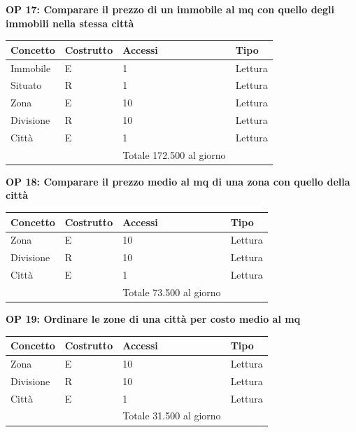 \documentclass[a4paper,12pt]{report}
\begin{document}
            \textbf{OP 17: Comparare il prezzo di un immobile al mq con quello degli immobili nella stessa città}
        	\begin{table}[H]
            \centering
             \begin{tabular}{||l l l l||}
             \hline
             Concetto & Costrutto & Accessi & Tipo \\ [0.5ex] 
             \hline\hline
             Immobile & E & 1 & Lettura \\ 
             Situato & R & 1 & Lettura \\ 
             Zona & E & 10 & Lettura \\ 
             Divisione & R & 10 & Lettura \\ 
             Città & E & 1 & Lettura \\ 
             \hline
                &   & Totale  172.500 al giorno &  \\ [1ex] 
             \hline
             \end{tabular}
            \end{table}

            \textbf{OP 18: Comparare il prezzo medio al mq di una zona con quello della città}
        	\begin{table}[H]
            \centering
             \begin{tabular}{||l l l l||}
             \hline
             Concetto & Costrutto & Accessi & Tipo \\ [0.5ex] 
             \hline\hline
             Zona & E & 10 & Lettura \\ 
             Divisione & R & 10 & Lettura \\ 
             Città & E & 1 & Lettura \\ 
             \hline
                &   & Totale  73.500 al giorno &  \\ [1ex] 
             \hline
             \end{tabular}
            \end{table}

            \textbf{OP 19: Ordinare le zone di una città per costo medio al mq}
        	\begin{table}[H]
            \centering
             \begin{tabular}{||l l l l||}
             \hline
             Concetto & Costrutto & Accessi & Tipo \\ [0.5ex] 
             \hline\hline
             Zona & E & 10 & Lettura \\ 
             Divisione & R & 10 & Lettura \\ 
             Città & E & 1 & Lettura \\ 
             \hline
                &   & Totale  31.500 al giorno &  \\ [1ex] 
             \hline
             \end{tabular}
            \end{table}
\end{document}
